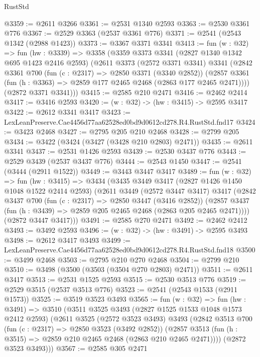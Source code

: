 \begin{lexlean}{RustStd}
\begin{coremodule}
@3359 := @2611 @3266
@3361 := @2531 @1340 @2593
@3363 := @2530 @3361 @776
@3367 := @2529 @3363 (@2537 @3361 @776)
@3371 := @2541 (@2543 @1342 (@2988 @1423))
@3373 := @3367 @3371 @3341
@3413 := fun (w : @32) =>
  fun (hw : @3339) =>
  @3358
    (@3359
      @3373
      @3341
      (@2827 @1340 @1342 @695 @1423 @2416 @2593)
      (@2611
        @3373
        (@2572 @3371 @3341)
        @3341
        (@2842
          @3361
          @700
          (fun (c : @2317) => @2850 @3371 (@3340 @2852))
          (@2857 @3361 (fun (h : @3363) => @2859 @177 @2465 @2468 (@2863 @177 @2465 @2471))))
        (@2872 @3371 @3341)))
@3415 := @2585 @210 @2471
@3416 := @2462 @2414
@3417 := @3416 @2593
@3420 := (w : @32) -> (hw : @3415) -> @2595 @3417
@3422 := @2612 @3341 @3417
@3423 := LexLeanPreserve.Cae4456d77aa62528ed0bd9d0612cd278.R4.RustStd.fnd17
@3424 := @3423 @2468
@3427 := @2795 @205 @210 @2468
@3428 := @2799 @205
@3434 := @3422 (@3424 (@3427 (@3428 @210 @2803) @2471))
@3435 := @2611 @3341
@3437 := @2531 @1426 @2593
@3439 := @2530 @3437 @776
@3443 := @2529 @3439 (@2537 @3437 @776)
@3444 := @2543 @1450
@3447 := @2541 (@3444 (@2911 @1522))
@3449 := @3443 @3447 @3417
@3489 := fun (w : @32) =>
  fun (hw : @3415) =>
  @3434
    (@3435
      @3449
      @3417
      (@2827 @1426 @1450 @1048 @1522 @2414 @2593)
      (@2611
        @3449
        (@2572 @3447 @3417)
        @3417
        (@2842
          @3437
          @700
          (fun (c : @2317) => @2850 @3447 (@3416 @2852))
          (@2857 @3437 (fun (h : @3439) => @2859 @205 @2465 @2468 (@2863 @205 @2465 @2471))))
        (@2872 @3447 @3417)))
@3491 := @2585 @270 @2471
@3492 := @2462 @2412
@3493 := @3492 @2593
@3496 := (w : @32) -> (hw : @3491) -> @2595 @3493
@3498 := @2612 @3417 @3493
@3499 := LexLeanPreserve.Cae4456d77aa62528ed0bd9d0612cd278.R4.RustStd.fnd18
@3500 := @3499 @2468
@3503 := @2795 @210 @270 @2468
@3504 := @2799 @210
@3510 := @3498 (@3500 (@3503 (@3504 @270 @2803) @2471))
@3511 := @2611 @3417
@3513 := @2531 @1525 @2593
@3515 := @2530 @3513 @776
@3519 := @2529 @3515 (@2537 @3513 @776)
@3523 := @2541 (@2543 @1533 (@2911 @1573))
@3525 := @3519 @3523 @3493
@3565 := fun (w : @32) =>
  fun (hw : @3491) =>
  @3510
    (@3511
      @3525
      @3493
      (@2827 @1525 @1533 @1048 @1573 @2412 @2593)
      (@2611
        @3525
        (@2572 @3523 @3493)
        @3493
        (@2842
          @3513
          @700
          (fun (c : @2317) => @2850 @3523 (@3492 @2852))
          (@2857 @3513 (fun (h : @3515) => @2859 @210 @2465 @2468 (@2863 @210 @2465 @2471))))
        (@2872 @3523 @3493)))
@3567 := @2585 @305 @2471

\end{coremodule}
\end{lexlean}
